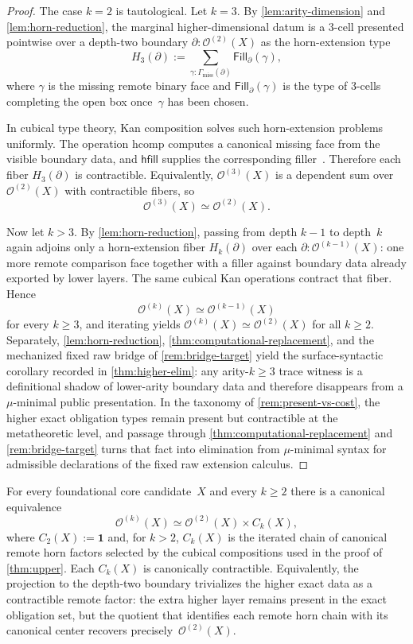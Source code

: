 \documentclass{lmcs}
\newcommand{\Ocal}{\mathcal{O}}
\newcommand{\hcomp}{\mathrm{hcomp}}
\begin{document}
\begin{proof}
The case $k=2$ is tautological. Let $k=3$. By \autoref{lem:arity-dimension} and \autoref{lem:horn-reduction}, the marginal higher-dimensional datum is a $3$-cell presented pointwise over a depth-two boundary $\partial : \Ocal^{(2)}(X)$ as the horn-extension type
\[
  H_3(\partial)
  :=
  \sum_{\gamma : \Gamma_{\mathrm{miss}}(\partial)}
  \mathsf{Fill}_{\partial}(\gamma),
\]
where $\gamma$ is the missing remote binary face and $\mathsf{Fill}_{\partial}(\gamma)$ is the type of $3$-cells completing the open box once~$\gamma$ has been chosen.

In cubical type theory, Kan composition solves such horn-extension problems uniformly. The operation $\hcomp$ computes a canonical missing face from the visible boundary data, and $\mathsf{hfill}$ supplies the corresponding filler~\cite{cubical,cchm-hits}. Therefore each fiber $H_3(\partial)$ is contractible. Equivalently, $\Ocal^{(3)}(X)$ is a dependent sum over $\Ocal^{(2)}(X)$ with contractible fibers, so
\[
  \Ocal^{(3)}(X) \simeq \Ocal^{(2)}(X).
\]

Now let $k>3$. By \autoref{lem:horn-reduction}, passing from depth $k-1$ to depth~$k$ again adjoins only a horn-extension fiber $H_k(\partial)$ over each $\partial : \Ocal^{(k-1)}(X)$: one more remote comparison face together with a filler against boundary data already exported by lower layers. The same cubical Kan operations contract that fiber. Hence
\[
  \Ocal^{(k)}(X) \simeq \Ocal^{(k-1)}(X)
\]
for every $k \geq 3$, and iterating yields $\Ocal^{(k)}(X) \simeq \Ocal^{(2)}(X)$ for all $k \geq 2$. Separately, \autoref{lem:horn-reduction}, \autoref{thm:computational-replacement}, and the mechanized fixed raw bridge of \autoref{rem:bridge-target} yield the surface-syntactic corollary recorded in \autoref{thm:higher-elim}: any arity-$k \geq 3$ trace witness is a definitional shadow of lower-arity boundary data and therefore disappears from a $\mu$-minimal public presentation.
In the taxonomy of \autoref{rem:present-vs-cost}, the higher exact obligation types remain present but contractible at the metatheoretic level, and passage through \autoref{thm:computational-replacement} and \autoref{rem:bridge-target} turns that fact into elimination from $\mu$-minimal syntax for admissible declarations of the fixed raw extension calculus.
\end{proof}

\begin{cor}
\label{cor:contractible-factor}
For every foundational core candidate~$X$ and every $k \geq 2$ there is a canonical equivalence
\[
  \Ocal^{(k)}(X) \simeq \Ocal^{(2)}(X) \times C_k(X),
\]
where $C_2(X) := \mathbf{1}$ and, for $k>2$, $C_k(X)$ is the iterated chain of canonical remote horn factors selected by the cubical compositions used in the proof of \autoref{thm:upper}. Each $C_k(X)$ is canonically contractible.
Equivalently, the projection to the depth-two boundary trivializes the higher exact data as a contractible remote factor: the extra higher layer remains present in the exact obligation set, but the quotient that identifies each remote horn chain with its canonical center recovers precisely~$\Ocal^{(2)}(X)$.
\end{cor}
\end{document}
